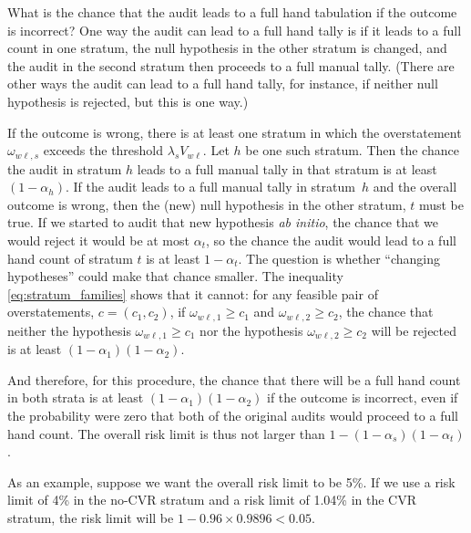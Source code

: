 What is the chance that the audit leads to a full hand tabulation if the outcome is incorrect?
One way the audit can lead to a full hand tally is if it leads to a full count in one stratum, 
the null hypothesis in the other stratum is changed, and the audit in the second 
stratum then proceeds to a full manual tally.
(There are other ways the audit can lead to a full hand tally, for instance, if neither
null hypothesis is rejected, but this is one way.)

If the outcome is wrong, there is at least one stratum in which the overstatement $\omega_{w\ell,s}$ 
exceeds the threshold $\lambda_s V_{w\ell}$.
Let $h$ be one such stratum. 
Then the chance the audit in stratum $h$ leads to a full manual tally in that stratum
is at least $(1-\alpha_h)$.
If the audit leads to a full manual tally in stratum~$h$ and the overall outcome is wrong,
then the (new) null hypothesis in the other stratum, $t$ must be true.
If we started to audit that new hypothesis \emph{ab initio}, the chance that we would reject it
would be at most $\alpha_t$, so the chance the audit would lead to a full hand count 
of stratum $t$ is at least $1-\alpha_t$.
The question is whether ``changing hypotheses'' could make that chance smaller.
The inequality \ref{eq:stratum_families} shows that it cannot: for any feasible pair of
overstatements, $c = (c_1, c_2)$, if $\omega_{w\ell,1} \ge c_1$ and $\omega_{w\ell,2} \ge c_2$,
the chance that neither the hypothesis $\omega_{w\ell,1} \ge c_1$ nor the hypothesis 
$\omega_{w\ell,2} \ge c_2$ will be rejected is at least $(1-\alpha_1)(1-\alpha_2)$.

And therefore, for this procedure, the chance that there will be a full hand count in both strata is at least 
$(1-\alpha_1)(1-\alpha_2)$ if the outcome is incorrect,
even if the probability were zero that both of the original audits would proceed to a full hand count.
The overall risk limit is thus not larger than $1 - (1-\alpha_s)(1-\alpha_t)$.

As an example, suppose we want the overall risk limit to be 5\%. 
If we use a risk limit of 4\% in the no-CVR stratum and a risk limit of 1.04\% in the CVR stratum,
the risk limit will be $1 - 0.96\times 0.9896 < 0.05$.

